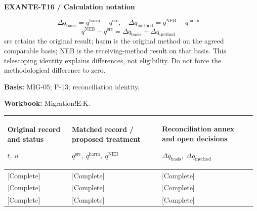 \textbf{EXANTE-T16 / Calculation notation}\par
{\fontsize{9}{11}\selectfont\[ \Delta q_{\mathrm{basis}}=q^{\mathrm{harm}}-q^{\mathrm{src}},\quad \Delta q_{\mathrm{method}}=q^{\mathrm{NEB}}-q^{\mathrm{harm}} \]}
{\fontsize{9}{11}\selectfont\[ q^{\mathrm{NEB}}-q^{\mathrm{src}}=\Delta q_{\mathrm{basis}}+\Delta q_{\mathrm{method}} \]}
src retains the original result; harm is the original method on the agreed comparable basis; NEB is the receiving-method result on that basis. This telescoping identity explains differences, not eligibility. Do not force the methodological difference to zero.\par
\textbf{Basis:} MIG-05; P-13; reconciliation identity.\par
\textbf{Workbook:} Migration!E:K.\par\endgroup
{\sffamily\fontsize{8.3}{10.3}\selectfont\begin{longtable}{@{}P{54.83mm} P{54.83mm} P{54.83mm}@{}}
\toprule
\textbf{Original record and status}\par {\normalfont\fontsize{8.2}{10}\selectfont $t,\ u$} & \textbf{Matched record / proposed treatment}\par {\normalfont\fontsize{8.2}{10}\selectfont $q^{\mathrm{src}},\ q^{\mathrm{harm}},\ q^{\mathrm{NEB}}$} & \textbf{Reconciliation annex and open decisions}\par {\normalfont\fontsize{8.2}{10}\selectfont $\Delta q_{\mathrm{basis}},\ \Delta q_{\mathrm{method}}$}\\\midrule\endhead
\rule{0pt}{8mm}[Complete] & [Complete] & [Complete]\\\hline
\rule{0pt}{8mm}[Complete] & [Complete] & [Complete]\\\hline
\rule{0pt}{8mm}[Complete] & [Complete] & [Complete]\\\hline
\end{longtable}}
\par\begingroup\sffamily\fontsize{8}{10}\selectfont\color{NEBGreen}\setlength{\parskip}{2pt}\setlength{\abovedisplayskip}{4pt}\setlength{\belowdisplayskip}{4pt}\setlength{\abovedisplayshortskip}{2pt}\setlength{\belowdisplayshortskip}{3pt}
